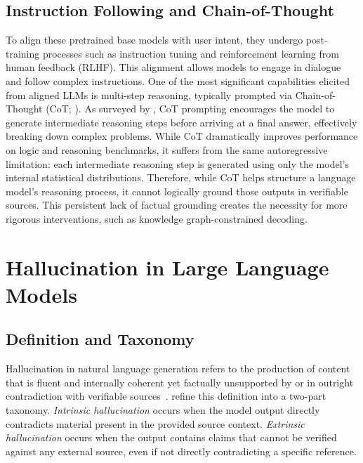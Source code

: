 \subsection{Instruction Following and Chain-of-Thought}

To align these pretrained base models with user intent, they undergo post-training processes such as instruction tuning and reinforcement learning from human feedback (RLHF). This alignment allows models to engage in dialogue and follow complex instructions. One of the most significant capabilities elicited from aligned LLMs is multi-step reasoning, typically prompted via Chain-of-Thought (CoT; \citealt{wei2022cot}). As surveyed by \citet{huang2023towards}, CoT prompting encourages the model to generate intermediate reasoning steps before arriving at a final answer, effectively breaking down complex problems. While CoT dramatically improves performance on logic and reasoning benchmarks, it suffers from the same autoregressive limitation: each intermediate reasoning step is generated using only the model's internal statistical distributions. Therefore, while CoT helps structure a language model's reasoning process, it cannot logically ground those outputs in verifiable sources. This persistent lack of factual grounding creates the necessity for more rigorous interventions, such as knowledge graph-constrained decoding.

\section{Hallucination in Large Language Models}
\label{sec:hallucination}

\subsection{Definition and Taxonomy}

Hallucination in natural language generation refers to the production of content that is fluent and internally coherent yet factually unsupported by or in outright contradiction with verifiable sources~\citep{ji2023survey}. \citet{huang2023hallucination} refine this definition into a two-part taxonomy. \textit{Intrinsic hallucination} occurs when the model output directly contradicts material present in the provided source context. \textit{Extrinsic hallucination} occurs when the output contains claims that cannot be verified against any external source, even if not directly contradicting a specific reference.

